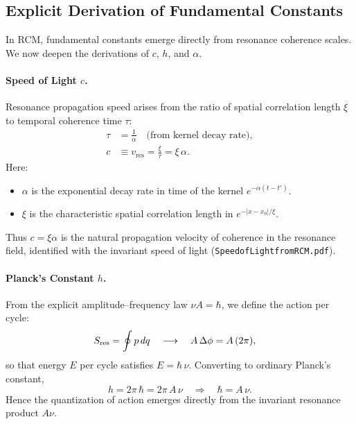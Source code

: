 \subsection{Explicit Derivation of Fundamental Constants}
\label{sec:constants-from-pitch}

In RCM, fundamental constants emerge directly from resonance coherence scales.  We now deepen the derivations of \(c\), \(h\), and \(\alpha\).

\paragraph{Speed of Light \(c\).}
Resonance propagation speed arises from the ratio of spatial correlation length \(\xi\) to temporal coherence time \(\tau\):
\begin{align}
  \tau &= \frac{1}{\alpha}\quad\text{(from kernel decay rate)},\\
  c &\equiv v_{\mathrm{res}} = \frac{\xi}{\tau}
    = \xi\,\alpha.
\end{align}
Here:
\begin{itemize}
  \item \(\alpha\) is the exponential decay rate in time of the kernel \(e^{-\alpha(t - t')}\).
  \item \(\xi\) is the characteristic spatial correlation length in \(e^{-|x - x_0|/\xi}\).
\end{itemize}
Thus \(c=\xi\alpha\) is the natural propagation velocity of coherence in the resonance field, identified with the invariant speed of light (\texttt{SpeedofLightfromRCM.pdf}).

\paragraph{Planck’s Constant \(h\).}
From the explicit amplitude–frequency law \(\nu A = \hbar\), we define the action per cycle:
\begin{align}
  S_{\rm res} &= \oint p\,dq 
    \quad\longrightarrow\quad A\,\Delta\phi
    = A\,(2\pi),
\end{align}
so that energy \(E\) per cycle satisfies \(E = \hbar\,\nu\).  Converting to ordinary Planck’s constant,
\begin{equation}
  h = 2\pi\,\hbar 
    = 2\pi\,A\,\nu \quad\Longrightarrow\quad
    \hbar = A\,\nu.
\end{equation}
Hence the quantization of action emerges directly from the invariant resonance product \(A\nu\).

